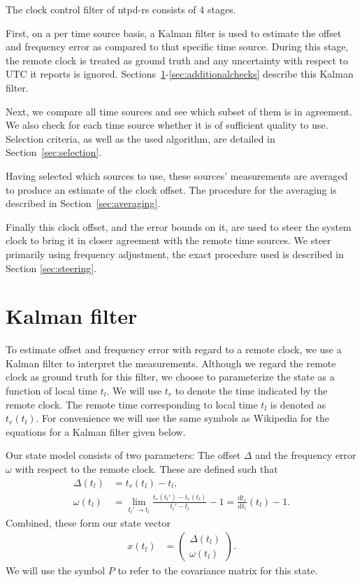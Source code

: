 \documentclass{article}
\begin{document}
The clock control filter of ntpd-rs consists of 4 stages.

First, on a per time source basis, a Kalman filter is used to estimate the offset and frequency error as compared to that specific time source.
During this stage, the remote clock is treated as ground truth and any uncertainty with respect to UTC it reports is ignored.
Sections~\ref{sec:Kalmanfilter}-\ref{sec:additionalchecks} describe this Kalman filter.

Next, we compare all time sources and see which subset of them is in agreement.
We also check for each time source whether it is of sufficient quality to use.
Selection criteria, as well as the used algorithm, are detailed in Section~\ref{sec:selection}.

Having selected which sources to use, these sources' measurements are averaged to produce an estimate of the clock offset.
The procedure for the averaging is described in Section~\ref{sec:averaging}.

Finally this clock offset, and the error bounds on it, are used to steer the system clock to bring it in closer agreement with the remote time sources.
We steer primarily using frequency adjustment, the exact procedure used is described in Section \ref{sec:steering}.

\section{Kalman filter}\label{sec:Kalmanfilter}

To estimate offset and frequency error with regard to a remote clock, we use a Kalman filter to interpret the measurements.
Although we regard the remote clock as ground truth for this filter, we choose to parameterize the state as a function of local time $t_l$.
We will use $t_r$ to denote the time indicated by the remote clock.
The remote time corresponding to local time $t_l$ is denoted as $t_r(t_l)$.
For convenience we will use the same symbols as Wikipedia for the equations for a Kalman filter given below.

Our state model consists of two parameters: The offset $\Delta$ and the frequency error $\omega$ with respect to the remote clock. These are defined such that
\begin{align}
\Delta(t_l) &= t_r(t_l) - t_l, \\
\omega(t_l) &= \lim_{t_l' \rightarrow t_l}\frac{t_r(t_l') - t_r(t_l)}{t_l' - t_l} - 1 = \frac{\mathrm{d} t_r}{\mathrm{d} t_l}(t_l) - 1.
\end{align}
Combined, these form our state vector
\begin{align}
x(t_l) &= \begin{pmatrix}
\Delta(t_l)\\
\omega(t_l)
\end{pmatrix}.
\end{align}
We will use the symbol $P$ to refer to the covariance matrix for this state.
\end{document}
